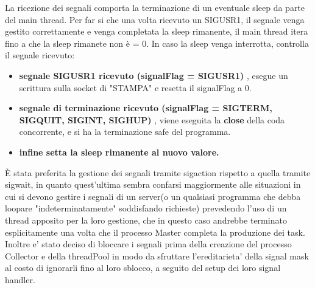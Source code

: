 \documentclass{article}
\begin{document}
La ricezione dei segnali comporta la terminazione di un eventuale sleep da parte del main thread. Per far si che una volta ricevuto un SIGUSR1, il segnale venga gestito correttamente e venga completata la sleep rimanente, il main thread itera fino a che la sleep rimanete non è = 0. In caso la sleep venga interrotta, controlla il segnale ricevuto:
\begin{itemize}
    \itemsep 0em
    \item \textbf{segnale SIGUSR1 ricevuto (signalFlag = SIGUSR1) }, esegue un scrittura sulla socket di "STAMPA" e resetta il signalFlag a 0.
    \item \textbf{segnale di terminazione ricevuto (signalFlag = SIGTERM, SIGQUIT, SIGINT, SIGHUP) }, viene eseguita la \textbf{close} della coda concorrente, e si ha la terminazione safe del programma.
    \item \textbf{infine setta la sleep rimanente al nuovo valore.}
\end{itemize}

È stata preferita la gestione dei segnali tramite sigaction rispetto a quella tramite sigwait, in quanto quest'ultima sembra confarsi maggiormente alle situazioni in cui si devono gestire i segnali di un server(o un qualsiasi programma che debba loopare "indeterminatamente" soddisfando richieste) prevedendo l'uso di un thread apposito per la loro gestione, che in questo caso andrebbe terminato esplicitamente una volta che il processo Master completa la produzione dei task. Inoltre e' stato deciso di bloccare i segnali prima della creazione del processo Collector e della threadPool in modo da sfruttare l'ereditarieta' della signal mask al costo di ignorarli fino al loro sblocco, a seguito del setup dei loro signal handler.
\end{document}

